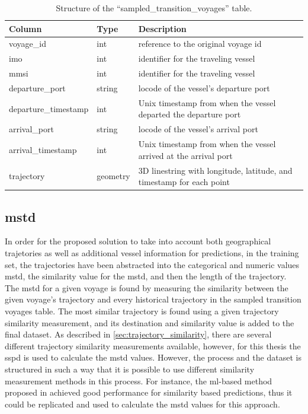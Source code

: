 \begin{table}[htbp]
    \centering
    \small{\begin{tabularx}{1.0\textwidth}{p{1.3in} p{0.75in} X}
        \bfseries{Column} & \bfseries{Type} & \bfseries{Description} \\ \toprule
        voyage\_id & int & reference to the original voyage id \\ \midrule
        imo & int & identifier for the traveling vessel\\ \midrule
        mmsi & int & identifier for the traveling vessel\\ \midrule
        departure\_port & string & \gls{locode} of the vessel's departure port \\ \midrule
        departure\_timestamp & int & Unix timestamp from when the vessel departed the departure port \\ \midrule
        arrival\_port & string & \gls{locode} of the vessel's arrival port \\ \midrule
        arrival\_timestamp & int & Unix timestamp from when the vessel arrived at the arrival port \\ \midrule
        trajectory & geometry & 3D linestring with longitude, latitude, and timestamp for each point \\ \bottomrule
    \end{tabularx}}
\caption{Structure of the ``sampled\_transition\_voyages'' table.}\label{tab:sampled_voyages}
\end{table}

\subsection{\acrfull{mstd}}

In order for the proposed solution to take into account both geographical trajetories as well as additional vessel information for predictions, in the training set, the trajectories have been abstracted into the categorical and numeric values \acrfull{mstd}, the similarity value for the \acrshort{mstd}, and then the length of the trajectory. The \acrshort{mstd} for a given voyage is found by measuring the similarity between the given voyage's trajectory and every historical trajectory in the sampled transition voyages table. The most similar trajectory is found using a given trajectory similarity measurement, and its destination and similarity value is added to the final dataset. As described in \cref{sec:trajectory_similarity}, there are several different trajectory similarity measurements available, however, for this thesis the \acrfull{sspd} is used to calculate the \acrshort{mstd} values. However, the process and the dataset is structured in such a way that it is possible to use different similarity measurement methods in this process. For instance, the \acrshort{ml}-based method proposed in \cite{Zhang2020AISApproach} achieved good performance for similarity based predictions, thus it could be replicated and used to calculate the \acrshort{mstd} values for this approach.


